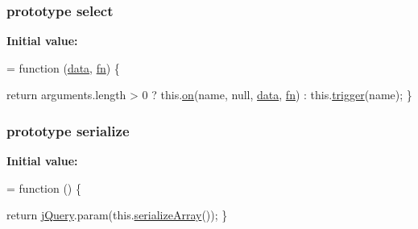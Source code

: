 \subsubsection[{\texorpdfstring{select}{select}}]{ {\bf prototype} select}\hypertarget{jquery-2_82_81-vsdoc_8js_a861f73402c6bb8457b04e4c36686ce8c}{}\label{jquery-2_82_81-vsdoc_8js_a861f73402c6bb8457b04e4c36686ce8c}
{\bfseries Initial value\+:}
\begin{DoxyCode}
= \textcolor{keyword}{function} (\hyperlink{jquery-2_82_81-vsdoc_8js_a609407b3456fdc3c5671a9fc4a226ff7}{data}, \hyperlink{jquery-2_82_81-vsdoc_8js_acef6bdaf6b9b20fdcca1ea86f0902c3b}{fn}) \{
        

        \textcolor{keywordflow}{return} arguments.length > 0 ?
            this.\hyperlink{jquery-2_82_81-vsdoc_8js_ae453b412b883f60220d73468ef6c6dbc}{on}(name, null, \hyperlink{jquery-2_82_81-vsdoc_8js_a609407b3456fdc3c5671a9fc4a226ff7}{data}, \hyperlink{jquery-2_82_81-vsdoc_8js_acef6bdaf6b9b20fdcca1ea86f0902c3b}{fn}) :
            this.\hyperlink{jquery-2_82_81-vsdoc_8js_a2388c4114d5e3e4eab020f973641519c}{trigger}(name);
    \}
\end{DoxyCode}
\subsubsection[{\texorpdfstring{serialize}{serialize}}]{ {\bf prototype} serialize}\hypertarget{jquery-2_82_81-vsdoc_8js_a4df62e04698a766c2951740e57243503}{}\label{jquery-2_82_81-vsdoc_8js_a4df62e04698a766c2951740e57243503}
{\bfseries Initial value\+:}
\begin{DoxyCode}
= \textcolor{keyword}{function} () \{
        

        \textcolor{keywordflow}{return} \hyperlink{jquery-2_82_81-vsdoc_8js_add5237586d970a38a81f990e8eb28c6c}{jQuery}.param(this.\hyperlink{jquery-2_82_81-vsdoc_8js_a0ba7b24b29b3762704d7b7da11b98315}{serializeArray}());
    \}
\end{DoxyCode}
